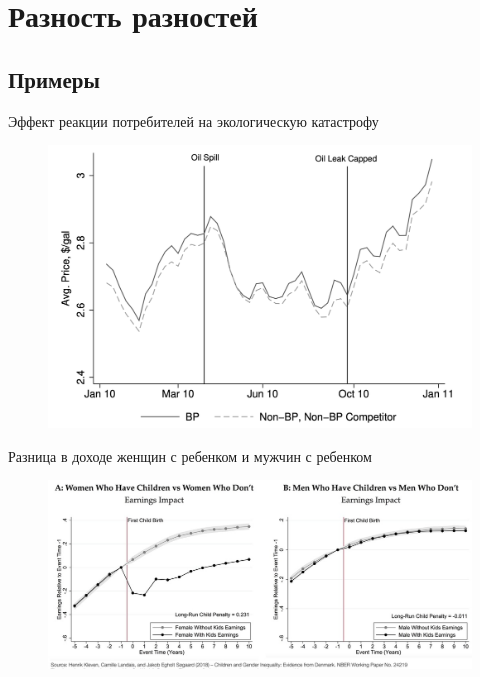 


\section{Разность разностей}
\subsection{Примеры}

\begin{frame}{Эффект реакции потребителей на экологическую катастрофу \parencite{barrage2014advertising}}
\begin{figure}
    \centering
    \includegraphics[width=\textwidth]{Images/oil.png}
    \label{fig:my_label}
\end{figure}
\end{frame}

\begin{frame}{Разница в доходе женщин с ребенком и мужчин с ребенком \parencite{kleven2019children}}
\begin{figure}
    \centering
    \includegraphics[width=\textwidth]{Images/gender.jpg}
    \label{fig:my_label}
\end{figure}
\end{frame}

